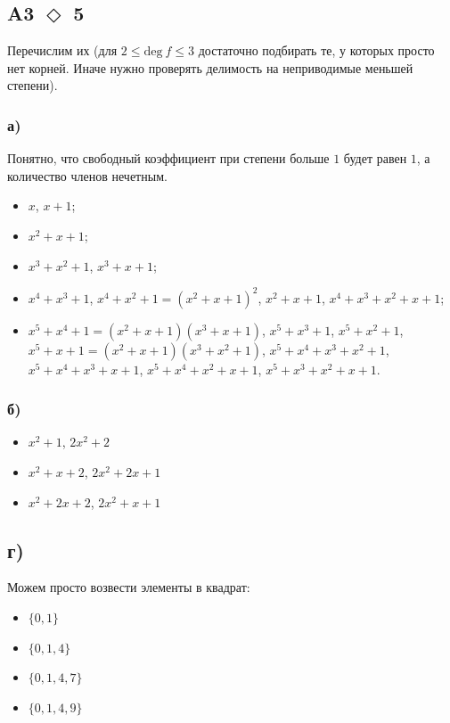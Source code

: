 \documentclass[a4paper]{article}
\newcommand{\task}[2]{A#1 $\Diamond$ #2}
\begin{document}
  \subsection*{\task{3}{5}}
  Перечислим их (для $2 \le \mathrm{deg}\: f \le 3$ достаточно подбирать те, у которых просто нет корней. Иначе нужно проверять делимость на неприводимые меньшей степени).
  \subsubsection*{а)}
  Понятно, что свободный коэффициент при степени больше $1$ будет равен $1$, а количество членов нечетным.
  \begin{itemize}
     \item $x$, $x + 1$;
     \item $x^2 + x + 1$;
     \item $x^3 + x^2 + 1$, $x^3 + x + 1$;
     \item $x^4 + x^3 + 1$, \sout{$x^4 + x^2 + 1 = (x^2 + x + 1)^2$}, $x^2 + x + 1$, $x^4 + x^3 + x^2 + x + 1$;
     \item \sout{$x^5 + x^4 + 1 = (x^2 + x + 1)(x^3 + x+ 1)$}, $x^5 + x^3 + 1$, $x^5 + x^2 + 1$,\\ \sout{$x^5 + x + 1 = (x^2 + x + 1)(x^3 + x^2 + 1)$},
     $x^5 + x^4 + x^3 + x^2 + 1$, $x^5 + x^4 + x^3 + x + 1$, $x^5 + x^4 + x^2 + x + 1$, $x^5 + x^3 + x^2 + x + 1$.
  \end{itemize}
  \subsubsection*{б)}
  \begin{itemize}
      \item $x^2 + 1$, $2x^2 + 2$
      \item $x^2 + x + 2$, $2x^2 + 2x + 1$
      \item $x^2 + 2x + 2$, $2x^2 + x + 1$
  \end{itemize}
  \subsection*{г)}
  Можем просто возвести элементы в квадрат:
  \begin{itemize}
      \item $\{0, 1\}$
      \item $\{0, 1, 4\}$
      \item $\{0, 1, 4, 7\}$
      \item $\{0, 1, 4, 9\}$
  \end{itemize}
\end{document}
